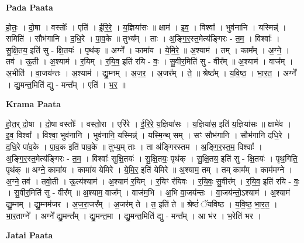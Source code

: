 \documentclass[17pt]{extarticle}
\begin{document}
\textbf{Pada Paata} \newline

हो॒तः॒ । दो॒षा । वस्तोः᳚ । एति॑ । ई॒रि॒रे॒ । य॒ज्ञिया॑सः ॥ क्षाम॑ । इ॒व॒ । विश्वा᳚ । भुव॑नानि । यस्मिन्न्॑ । समिति॑ । सौभ॑गानि । द॒धि॒रे । पा॒व॒के ॥ तुभ्य᳚म् । ताः । अ॒ङ्गि॒र॒स्त॒मेत्य॑ङ्गिरः - त॒म॒ । विश्वाः᳚ । सु॒क्षि॒तय॒ इति॑ सु - क्षि॒तयः॑ । पृथ॑क् ॥ अग्ने᳚ । कामा॑य । ये॒मि॒रे॒ ॥ अ॒श्याम॑ । तम् । काम᳚म् । अ॒ग्ने॒ । तव॑ । ऊ॒ती । अ॒श्याम॑ । र॒यिम् । र॒यि॒व॒ इति॑ रयि - वः॒ । सु॒वीर॒मिति॑ सु - वीर᳚म् ॥ अ॒श्याम॑ । वाज᳚म् । अ॒भीति॑ । वा॒जय॑न्तः । अ॒श्याम॑ । द्यु॒म्नम् । अ॒ज॒र॒ । अ॒जर᳚म् । ते॒ ॥ श्रेष्ठ᳚म् । य॒वि॒ष्ठ॒ । भा॒र॒त॒ । अग्ने᳚ । द्यु॒मन्त॒मिति॑ द्यु - मन्त᳚म् । एति॑ । भ॒र॒ ॥  \newline


\textbf{Krama Paata} \newline

हो॒त॒र् दो॒षा । दो॒षा वस्तोः᳚ । वस्तो॒रा । एरि॑रे । ई॒रि॒रे॒ य॒ज्ञिया॑सः । य॒ज्ञिया॑स॒ इति॑ य॒ज्ञिया॑सः ॥ क्षामे॑व । इ॒व॒ विश्वा᳚ । विश्वा॒ भुव॑नानि । भुव॑नानि॒ यस्मिन्न्॑ । यस्मि॒न्थ् सम् । सꣳ सौभ॑गानि । सौभ॑गानि दधि॒रे । द॒धि॒रे पा॑व॒के । पा॒व॒क इति॑ पाव॒के ॥ तुभ्य॒म् ताः । ता अ॑ङ्गिरस्तम । अ॒ङ्गि॒र॒स्त॒म॒ विश्वाः᳚ । अ॒ङ्गि॒र॒स्त॒मेत्य॑ङ्गिरः - त॒म॒ । विश्वाः᳚ सुक्षि॒तयः॑ । सु॒क्षि॒तयः॒ पृथ॑क् । सु॒क्षि॒तय॒ इति॑ सु - क्षि॒तयः॑ । पृथ॒गिति॒ पृथ॑क् ॥ अग्ने॒ कामा॑य । कामा॑य येमिरे । ये॒मि॒र॒ इति॑ येमिरे ॥ अ॒श्याम॒ तम् । तम् काम᳚म् । काम॑मग्ने । अ॒ग्ने॒ तव॑ । तवो॒ती । ऊ॒त्य॑श्याम॑ । अ॒श्याम॑ र॒यिम् । र॒यिꣳ र॑यिवः । र॒यि॒वः॒ सु॒वीर᳚म् । र॒यि॒व॒ इति॑ रयि - वः॒ । सु॒वीर॒मिति॑ सु - वीर᳚म् ॥ अ॒श्याम॒ वाज᳚म् । वाज॑म॒भि । अ॒भि वा॒जय॑न्तः । वा॒जय॑न्तो॒ऽश्याम॑ । अ॒श्याम॑ द्यु॒म्नम् । द्यु॒म्नम॑जर । अ॒ज॒रा॒जर᳚म् । अ॒जर॑म् ते । त॒ इति॑ ते ॥ श्रेष्ठं॑ ॅयविष्ठ । य॒वि॒ष्ठ॒ भा॒र॒त॒ । भा॒र॒ताग्ने᳚ । अग्ने᳚ द्यु॒मन्त᳚म् । द्यु॒मन्त॒मा । द्यु॒मन्त॒मिति॑ द्यु - मन्त᳚म् । आ भ॑र । भ॒रेति॑ भर । \newline

\textbf{Jatai Paata} \newline
\end{document}
